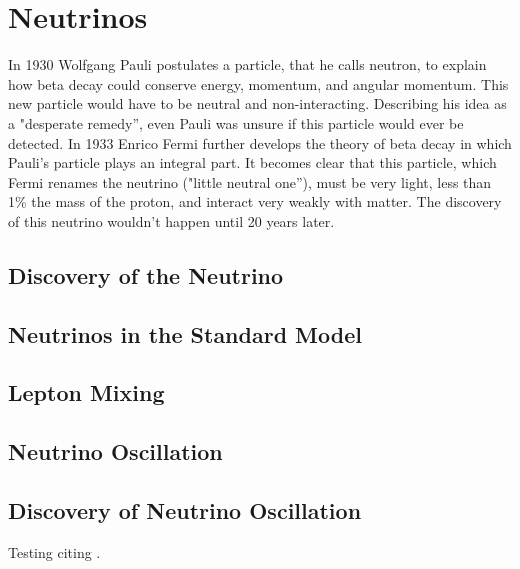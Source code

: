 \chapter{Neutrinos}

In 1930 Wolfgang Pauli postulates a particle, that he calls neutron, to explain how beta decay could conserve energy, momentum, and angular momentum. 
This new particle would have to be neutral and non-interacting. 
Describing his idea as a "desperate remedy'', even Pauli was unsure if this particle would ever be detected. 
In 1933 Enrico Fermi further develops the theory of beta decay in which Pauli's particle plays an integral part. 
It becomes clear that this particle, which Fermi renames the neutrino ("little neutral one''),
 must be very light, less than 1\% the mass of the proton, and interact very weakly with matter.
The discovery of this neutrino wouldn't happen until 20 years later.


\section{Discovery of the Neutrino}



\section{Neutrinos in the Standard Model} 

\section{Lepton Mixing}

\section{Neutrino Oscillation}

\section{Discovery of Neutrino Oscillation}






Testing citing \cite{Huber}.
